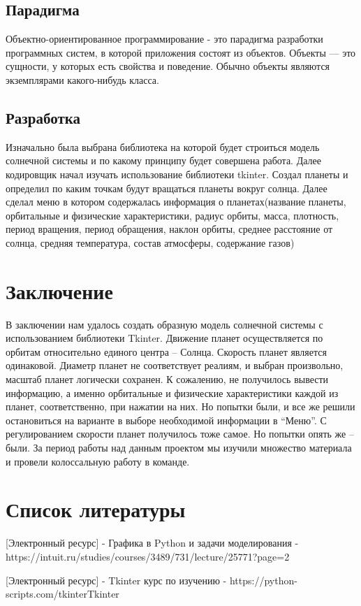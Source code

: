 \documentclass[14pt, oneside]{SavkinSeliverstov}
\begin{document}
\section{Парадигма}
Объектно-ориентированное программирование - это парадигма разработки программных систем, в которой приложения состоят из объектов.
Объекты — это сущности, у которых есть свойства и поведение. Обычно объекты являются экземплярами какого-нибудь класса.
\section{Разработка}
Изначально была выбрана библиотека на которой будет строиться модель солнечной системы и по какому принципу будет совершена работа. Далее кодировщик начал изучать использование библиотеки tkinter. Создал планеты и определил по каким точкам будут вращаться планеты вокруг солнца. Далее сделал меню в котором содержалась информация о планетах(название планеты, орбитальные и физические характеристики, радиус орбиты, масса, плотность, период вращения, период обращения, наклон орбиты, среднее расстояние от солнца, средняя температура, состав атмосферы, содержание газов)
\chapter*{Заключение}
В заключении нам удалось создать образную модель солнечной системы с использованием библиотеки Tkinter. Движение планет осуществляется по орбитам относительно единого центра – Солнца. Скорость планет является одинаковой. Диаметр планет не соответствует реалиям, и выбран произвольно, масштаб планет логически сохранен.  К сожалению, не получилось вывести информацию, а именно орбитальные и физические характеристики каждой из планет, соответственно, при нажатии на них. Но попытки были, и все же решили остановиться на варианте в выборе необходимой информации в “Меню”. С регулированием скорости планет получилось тоже самое. Но попытки опять же – были. За период работы над данным проектом мы изучили множество материала и провели колоссальную работу в команде.

\chapter*{Список литературы}
[Электронный ресурс] - Графика в Python и задачи моделирования -  https://intuit.ru/studies/courses/3489/731/lecture/25771?page=2

[Электронный ресурс] - Tkinter курс по изучению - https://python-scripts.com/tkinterTkinter
\end{document}
